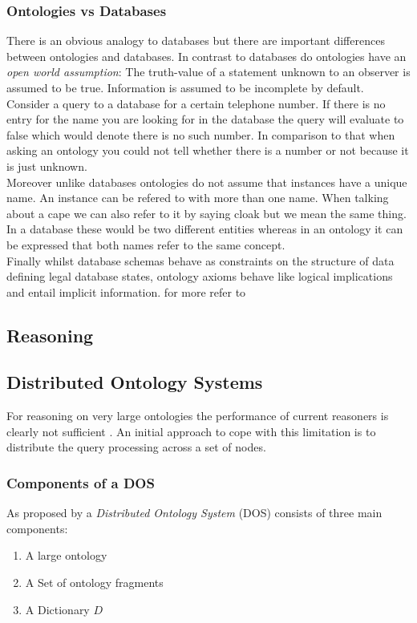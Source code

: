 \subsubsection{Ontologies vs Databases}
There is an obvious analogy to databases but there are important differences
between ontologies and databases.
In contrast to databases do ontologies have an \emph{open world assumption}:
The truth-value of a statement unknown to an observer is assumed to be true.
Information is assumed to be incomplete by default. Consider a query to
a database for a certain telephone number. If there is no entry for the
name you are looking for in the database the query will evaluate to false
which would denote there is no such number. In comparison to that when
asking an ontology you could not tell whether there is a number or not
because it is just unknown.\\
Moreover unlike databases ontologies do not assume that instances have
a unique name. An instance can be refered to with more than one name.
When talking about a cape we can also refer to it by saying cloak but we
mean the same thing. In a database these would be two different entities
whereas in an ontology it can be expressed that both names refer to the
same concept.\\
Finally whilst database schemas behave as constraints on the structure of
data defining legal database states, ontology axioms behave like logical
implications and entail implicit information.
for more refer to \cite{horrocks2008}


\subsection{Reasoning}

\subsection{Distributed Ontology Systems}
For reasoning on very large ontologies the performance of current
reasoners is clearly not sufficient \cite{chen09}. An initial approach to
cope with this limitation is to distribute the query processing across a
set of nodes.


\subsubsection{Components of a DOS}
As proposed by  a \emph{Distributed Ontology System} (DOS)
consists of three main components:
\begin{enumerate}
\item A large ontology
\item A Set of ontology fragments
\item A Dictionary $D$
\end{enumerate}

